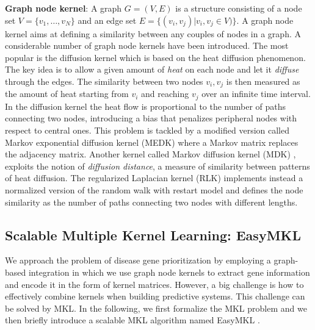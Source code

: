 \textbf{Graph node kernel}: A graph $G = (V,E)$ is a structure consisting of a node set $V=\{v_1,\dots,v_N\}$ and an edge set $E=\{(v_i,v_j) | v_i,v_j \in V)\}$. A graph node kernel aims at defining a similarity between any couples of nodes in a graph. A considerable number of graph node kernels have been introduced. The most popular is the diffusion kernel \cite{dk} which is based on the heat diffusion phenomenon. The key idea is to allow a given amount of {\em heat} on each node and let it {\em diffuse} through the edges. The similarity between two nodes $v_{i}, v_{j}$ is then measured as the amount of heat starting from $v_{i}$ and reaching $v_{j}$ over an infinite time interval. In the diffusion kernel the heat flow is proportional to the number of paths connecting two nodes, introducing a bias that penalizes peripheral nodes with respect to central ones. This problem is tackled by a modified version called Markov exponential diffusion kernel (MEDK) \cite{mrf} where a Markov matrix replaces the adjacency matrix.  Another kernel called Markov diffusion kernel (MDK) \cite{mdk}, exploits the notion of {\em diffusion distance}, a measure of similarity between patterns of heat diffusion. The regularized Laplacian kernel (RLK) \cite{rlk} implements instead a normalized version of the random walk with restart model and defines the node similarity as the number of paths connecting two nodes with different lengths.

\subsection*{Scalable Multiple Kernel Learning: EasyMKL}
We approach the problem of disease gene prioritization by employing a graph-based integration in which we use graph node kernels to extract gene information and encode it in the form of kernel matrices. However, a big challenge is how to effectively combine kernels when building predictive systems. This challenge can be solved by MKL. In the following, we first formalize the MKL problem and we then briefly introduce a scalable MKL algorithm named EasyMKL \cite{easymkl}.

